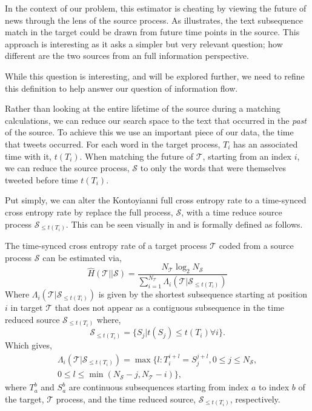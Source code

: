 In the context of our problem, this estimator is cheating by viewing the future of news through the lens of the source process. As  illustrates, the text subsequence match in the target could be drawn from future time points in the source. This approach is interesting as it asks a simpler but very relevant question; how different are the two sources from an full information perspective.


While this question is interesting, and will be explored further, we need to refine this definition to help answer our question of information flow.

Rather than looking at the entire lifetime of the source during a matching calculations, we can reduce our search space to the text that occurred in the \emph{past} of the source. To achieve this we use an important piece of our data, the time that tweets occurred. For each word in the target process, $T_i$ has an associated time with it, $t(T_i)$. When matching the future of $\mathcal{T}$, starting from an index $i$, we can reduce the source process, $\mathcal{S}$ to only the words that were themselves tweeted before time $t(T_i)$. 

Put simply, we can alter the Kontoyianni full cross entropy rate to a time-synced cross entropy rate by replace the full {\color{source}} process, $\mathcal{S}$, with a time reduce source process $\mathcal{S}_{ \leq t(T_i)}$. This can be seen visually in  and is formally defined as follows.

\begin{definition}
	The time-synced cross entropy rate of a {\color{target} target process} $\mathcal{T}$ coded from a {\color{source} source process} $\mathcal{S}$ can be estimated via,
	\begin{equation}
	\hat{H}(\mathcal{T} || \mathcal{S})=\frac{N_{\mathcal{T}} \log _{2} N_{\mathcal{S}}}{\sum_{i=1}^{N_{\mathcal{T}}} \Lambda_{i}(\mathcal{T}| \mathcal{S}_{\leq t(T_i) } )}
	\end{equation}
	Where $\Lambda_{i}(\mathcal{T}| \mathcal{S}_{\leq t(T_i) })$ is given by the shortest subsequence starting at position $i$ in {\color{target}target} $\mathcal{T}$ that does not appear as a contiguous subsequence in the time reduced {\color{source}source} $\mathcal{S}_{\leq t(T_i) }$ where,
	\begin{equation}
	\mathcal{S}_{\leq t(T_i) } = \{S_j | t(S_j) \leq t(T_i) \forall i \}.
	\end{equation}
	Which gives,
	\begin{align*}
	\Lambda_{i}(\mathcal{T}| \mathcal{S}_{\leq t(T_i)}) = \max \{l: T_i^{i+l}=S_{j}^{j+l}, 0 \leq j \leq N_{\mathcal{S}},  \\  0 \leq l \leq \min( N_{\mathcal{S}}- j , N_{\mathcal{T}}- i ) \},
	\end{align*}
	where $T_a^{b}$ and $S_a^b$ are continuous subsequences starting from index $a$ to index $b$ of the {\color{target} target}, $\mathcal{T}$ process, and the time reduced {\color{source} source}, $\mathcal{S}_{\leq t(T_i)}$, respectively.
\end{definition}
 
